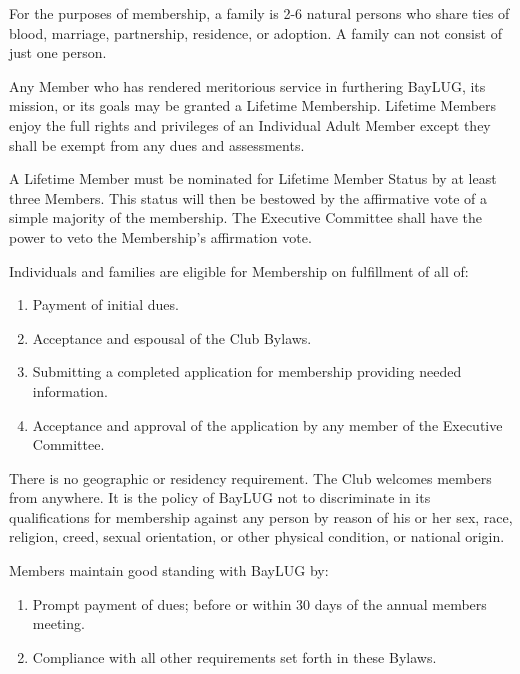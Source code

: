 \documentclass{bylaws}
\begin{document}
For the purposes of membership, a family is 2-6 natural persons who share ties of blood, marriage, partnership, residence, or adoption.  A family can not consist of just one person. 


Any Member who has rendered meritorious service in furthering BayLUG, its mission, or its goals may be granted a Lifetime Membership.  Lifetime Members enjoy the full rights and privileges of an Individual Adult Member except they shall be exempt from any dues and assessments.

A Lifetime Member must be nominated for Lifetime Member Status by at least three Members.  This status will then be bestowed by the affirmative vote of a simple majority of the membership.  The Executive Committee shall have the power to veto the Membership's affirmation vote.


\label{subsec:eligibility}

Individuals and families are eligible for Membership on fulfillment of all of: 
\begin{enumerate}
    \item Payment of initial dues. 
    \item Acceptance and espousal of the Club Bylaws. 
    \item Submitting a completed application for membership providing needed information. 
    \item Acceptance and approval of the application by any member of the Executive Committee. 
\end{enumerate}

There is no geographic or residency requirement. The Club welcomes members from anywhere.  It is the policy of BayLUG not to discriminate in its qualifications for membership against any person by reason of his or her sex, race, religion, creed, sexual orientation, or other physical condition, or national origin.

\label{subsec:good-standing}

Members maintain good standing with BayLUG by: 
\begin{enumerate}
    \item Prompt payment of dues; before or within 30 days of the annual members meeting. 
    \item Compliance with all other requirements set forth in these Bylaws.
\end{enumerate}
\end{document}
